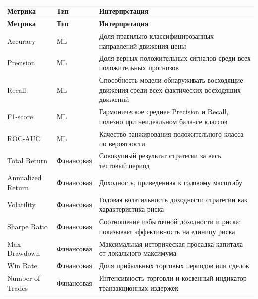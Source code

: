 \begin{center}
\small
\begin{longtable}{|p{3.4cm}|p{3.2cm}|p{7.2cm}|}
\hline
\textbf{Метрика} & \textbf{Тип} & \textbf{Интерпретация} \\
\hline
\endfirsthead
\hline
\textbf{Метрика} & \textbf{Тип} & \textbf{Интерпретация} \\
\hline
\endhead
Accuracy & ML & Доля правильно классифицированных направлений движения цены \\
\hline
Precision & ML & Доля верных положительных сигналов среди всех положительных прогнозов \\
\hline
Recall & ML & Способность модели обнаруживать восходящие движения среди всех фактических восходящих движений \\
\hline
F1-score & ML & Гармоническое среднее Precision и Recall, полезно при неидеальном балансе классов \\
\hline
ROC-AUC & ML & Качество ранжирования положительного класса по вероятности \\
\hline
Total Return & Финансовая & Совокупный результат стратегии за весь тестовый период \\
\hline
Annualized Return & Финансовая & Доходность, приведенная к годовому масштабу \\
\hline
Volatility & Финансовая & Годовая волатильность доходности стратегии как характеристика риска \\
\hline
Sharpe Ratio & Финансовая & Соотношение избыточной доходности и риска; показывает эффективность на единицу риска \\
\hline
Max Drawdown & Финансовая & Максимальная историческая просадка капитала от локального максимума \\
\hline
Win Rate & Финансовая & Доля прибыльных торговых периодов или сделок \\
\hline
Number of Trades & Финансовая & Интенсивность торговли и косвенный индикатор транзакционных издержек \\
\hline
\end{longtable}
\end{center}

